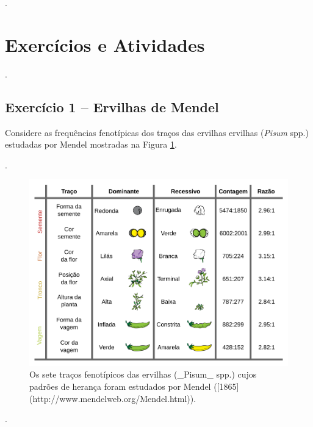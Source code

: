 \documentclass[
]{book}
\begin{document}
.\linebreak

\hypertarget{exercuxedcios-e-atividades}{%
\section{Exercícios e Atividades}\label{exercuxedcios-e-atividades}}

.\linebreak

\hypertarget{exercuxedcio-1-ervilhas-de-mendel}{%
\subsection{Exercício 1 -- Ervilhas de Mendel}\label{exercuxedcio-1-ervilhas-de-mendel}}

Considere as frequências fenotípicas dos traços das ervilhas ervilhas (\emph{Pisum} spp.) estudadas por Mendel mostradas na Figura \ref{fig:peatrait}.

.\linebreak

\begin{figure}

{\centering \includegraphics[width=600px]{figs/mendel_pea_traits} 

}

\caption{Os sete traços fenotípicos das ervilhas (_Pisum_ spp.) cujos padrões de herança foram estudados por Mendel ([1865](http://www.mendelweb.org/Mendel.html)).}\label{fig:peatrait}
\end{figure}

.\linebreak
\end{document}

